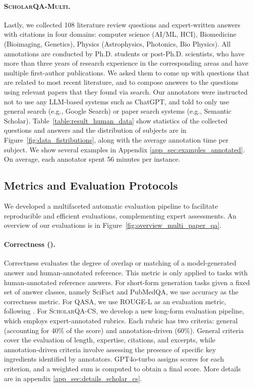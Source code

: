 \paragraph{\textsc{ScholarQA-Multi}.}
Lastly, we collected 108 literature review questions and expert-written answers with citations in four domains: computer science (AI/ML, HCI), Biomedicine (Bioimaging,  Genetics), Physics (Astrophysics, Photonics, Bio Physics). 
All annotations are conducted by Ph.D. students or post-Ph.D. scientists, who have more than three years of research experience in the corresponding areas and have multiple first-author publications. 
We asked them to come up with questions that are related to most recent literature, and to compose answers to the questions using relevant papers that they found via search. Our annotators were instructed not to use any LLM-based systems such as ChatGPT, and told to only use general search (e.g., Google Search) or paper search systems (e.g., Semantic Scholar). 
Table~\ref{table:result_human_data} show statistics of the collected questions and answers and the distribution of subjects are in Figure~\ref{fig:data_fistributions}, along with the average annotation time per subject. We show several examples in Appendix \ref{app_sec:examples_annotated}. 
On average, each annotator spent 56 minutes per instance.

\subsection{Metrics and Evaluation Protocols}
\label{subsec:automatic_eval}
We developed a multifaceted automatic evaluation pipeline to facilitate reproducible and efficient evaluations, complementing expert assessments. An overview of our evaluations is in Figure~\ref{fig:overview_multi_paper_qa}. 


\paragraph{Correctness (\acc).}
Correctness evaluates the degree of overlap or matching of a model-generated answer and human-annotated reference. This metric is only applied to tasks with human-annotated reference answers. 
For short-form generation tasks given a fixed set of answer classes, namely SciFact and PubMedQA, we use accuracy as the correctness metric. 
For QASA, we use ROUGE-L as an evaluation metric, following \cite{lee2023qasa}. 
For \textsc{ScholarQA-CS}, we develop a new long-form evaluation pipeline, which employs expert-annotated rubrics. Each rubric has two criteria: general (accounting for 40\% of the score) and annotation-driven (60\%). 
General criteria cover the evaluation of length, expertise, citations, and excerpts, while annotation-driven criteria involve assessing the presence of specific key ingredients identified by annotators. GPT4o-turbo assigns scores for each criterion, and a weighted sum is computed to obtain a final score. 
More details are in appendix \ref{app_sec:details_scholar_cs}. 

